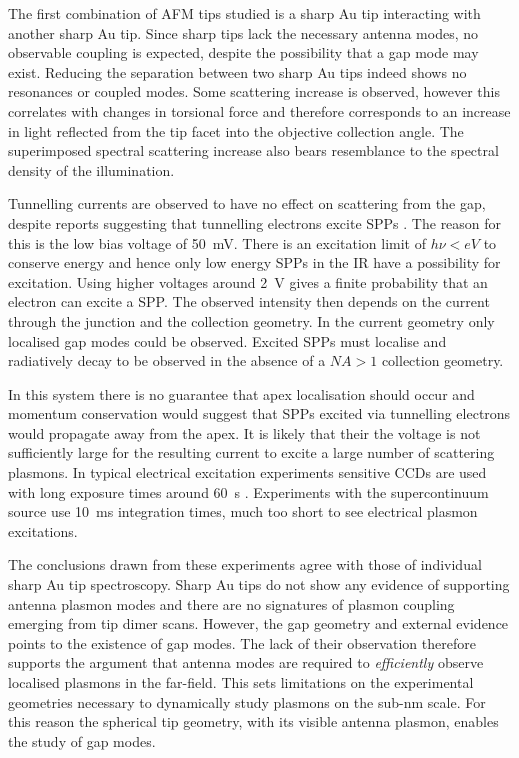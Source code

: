 \documentclass[a4paper]{article}
\begin{document}
The first combination of AFM tips studied is a sharp Au tip interacting with another sharp Au tip. Since sharp tips lack the necessary antenna modes, no observable coupling is expected, despite the possibility that a gap mode may exist. Reducing the separation between two sharp Au tips indeed shows no resonances or coupled modes. Some scattering increase is observed, however this correlates with changes in torsional force and therefore corresponds to an increase in light reflected from the tip facet into the objective collection angle. The superimposed spectral scattering increase also bears resemblance to the spectral density of the illumination.

Tunnelling currents are observed to have no effect on scattering from the gap, despite reports suggesting that tunnelling electrons excite SPPs \cite{lambe1976, berndt1991, bharadwaj2011, wang2011, divitt2013, ye2014}. The reason for this is the low bias voltage of \SI{50}{mV}. There is an excitation limit of $h\nu<eV$ to conserve energy \cite{} and hence only low energy SPPs in the IR have a possibility for excitation. Using higher voltages around \SI{2}{V} gives a finite probability that an electron can excite a SPP. The observed intensity then depends on the current through the junction and the collection geometry. In the current geometry only localised gap modes could be observed. Excited SPPs must localise and radiatively decay to be observed in the absence of a $\mathit{NA}>1$ collection geometry.

In this system there is no guarantee that apex localisation should occur and momentum conservation would suggest that SPPs excited via tunnelling electrons would propagate away from the apex.
It is likely that their the voltage is not sufficiently large for the resulting current to excite a large number of scattering plasmons. In typical electrical excitation experiments sensitive CCDs are used with long exposure times around \SI{60}{s} \cite{}. Experiments with the supercontinuum source use \SI{10}{ms} integration times, much too short to see electrical plasmon excitations.

The conclusions drawn from these experiments agree with those of individual sharp Au tip spectroscopy. Sharp Au tips do not show any evidence of supporting antenna plasmon modes and there are no signatures of plasmon coupling emerging from tip dimer scans. However, the gap geometry and external evidence \cite{} points to the existence of gap modes. The lack of their observation therefore supports the argument that antenna modes are required to \emph{efficiently} observe localised plasmons in the far-field. This sets limitations on the experimental geometries necessary to dynamically study plasmons on the sub-nm scale. For this reason the spherical tip geometry, with its visible antenna plasmon, enables the study of gap modes.
\end{document}
